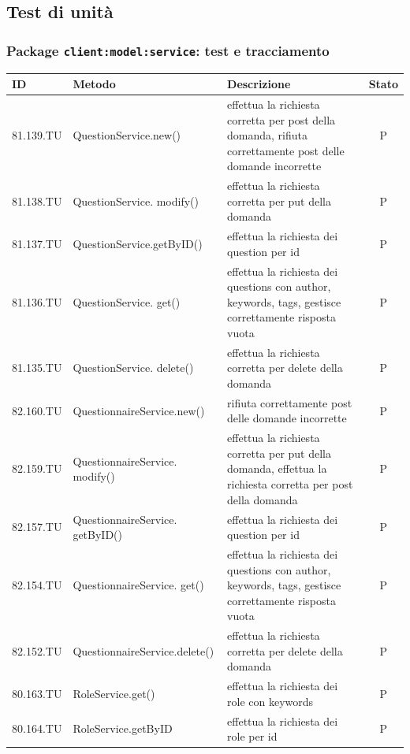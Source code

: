 \documentclass[12pt,a4paper]{article}
\begin{document}
\subsection{Test di unità}\label{test_unita}

\subsubsection{Package \texttt{client:model:service}: test e tracciamento}
\begin{center}
		\begin{longtable}[]{l l p{} c}\midrule
	\textbf{ID} & \textbf{Metodo} & \textbf{Descrizione} & \textbf{Stato}\\ \midrule
	\midrule
	81.139.TU& QuestionService.new() & effettua la richiesta corretta per post della domanda, rifiuta correttamente post delle domande incorrette & P\\ \midrule
	81.138.TU& QuestionService. modify() & effettua la richiesta corretta per put della domanda & P\\ \midrule
	81.137.TU& QuestionService.getByID() & effettua la richiesta dei question per id & P\\ \midrule
	81.136.TU& QuestionService. get() & effettua la richiesta dei questions con author, keywords, tags, gestisce correttamente risposta vuota & P\\ \midrule
	81.135.TU& QuestionService. delete() & effettua la richiesta corretta per delete della domanda& P\\ \midrule
	82.160.TU& QuestionnaireService.new() & rifiuta correttamente post delle domande incorrette & P\\ \midrule
	82.159.TU& QuestionnaireService. modify() & effettua la richiesta corretta per put della domanda, effettua la richiesta corretta per post della domanda & P\\ \midrule
	82.157.TU& QuestionnaireService. getByID() & effettua la richiesta dei question per id & P\\ \midrule
	82.154.TU& QuestionnaireService. get() & effettua la richiesta dei questions con author, keywords, tags, gestisce correttamente risposta vuota & P\\ \midrule
	82.152.TU& QuestionnaireService.delete() & effettua la richiesta corretta per delete della domanda & P\\ \midrule
	80.163.TU& RoleService.get() & effettua la richiesta dei role con keywords & P\\ \midrule
	80.164.TU& RoleService.getByID & effettua la richiesta dei role per id& P\\ \midrule

\end{longtable}
\end{center}
\end{document}
